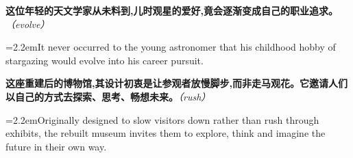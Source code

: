 \documentclass[11pt,a4paper]{article}
\newcommand{\num}[1]{\makebox[1.9em][r]{#1.}\hspace{0.3em}}
\newcommand{\prompt}[1]{\emph{\textcolor{tipblue}{\small（#1）}}}
\begin{document}
\begin{minipage}{\linewidth}

\num{3}\textbf{这位年轻的天文学家从未料到,儿时观星的爱好,竟会逐渐变成自己的职业追求。}\prompt{evolve}

\vspace{0.15em}

\noindent\hangindent=2.2em\hspace{2.2em}It never occurred to the young astronomer that his childhood hobby of stargazing would evolve into his career pursuit.

\end{minipage}

\begin{minipage}{\linewidth}

\num{4}\textbf{这座重建后的博物馆,其设计初衷是让参观者放慢脚步,而非走马观花。它邀请人们以自己的方式去探索、思考、畅想未来。}\prompt{rush}

\vspace{0.15em}

\noindent\hangindent=2.2em\hspace{2.2em}Originally designed to slow visitors down rather than rush through exhibits, the rebuilt museum invites them to explore, think and imagine the future in their own way.

\end{minipage}
\end{document}
